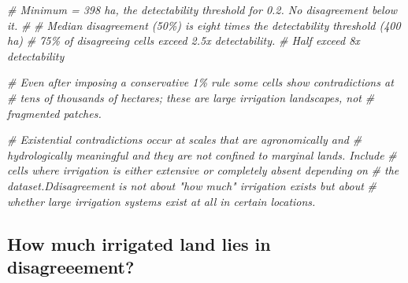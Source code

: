 \documentclass[
  11pt,
]{article}
\newenvironment{Shaded}{\begin{snugshade}}{\end{snugshade}}
\newcommand{\CommentTok}[1]{\textcolor[rgb]{0.56,0.35,0.01}{\textit{#1}}}
\newcommand{\FunctionTok}[1]{\textcolor[rgb]{0.13,0.29,0.53}{\textbf{#1}}}
\newcommand{\NormalTok}[1]{#1}
\newcommand{\OtherTok}[1]{\textcolor[rgb]{0.56,0.35,0.01}{#1}}
\newcommand{\SpecialCharTok}[1]{\textcolor[rgb]{0.81,0.36,0.00}{\textbf{#1}}}
\begin{document}
\begin{Shaded}
\begin{Highlighting}[]
\CommentTok{\# Minimum = 398 ha, the detectability threshold for 0.2. No disagreement below it.}
\CommentTok{\#}
\CommentTok{\# Median disagreement (50\%) is eight times the detectability threshold (400 ha)}
\CommentTok{\# 75\% of disagreeing cells exceed 2.5x detectability.}
\CommentTok{\# Half exceed 8x detectability}

\CommentTok{\# Even after imposing a conservative 1\% rule some cells show contradictions at}
\CommentTok{\# tens of thousands of hectares; these are large irrigation landscapes, not}
\CommentTok{\# fragmented patches.}

\CommentTok{\# Existential contradictions occur at scales that are agronomically and}
\CommentTok{\# hydrologically meaningful and they are not confined to marginal lands. Include}
\CommentTok{\# cells where irrigation is either extensive or completely absent depending on}
\CommentTok{\# the dataset.Ddisagreement is not about "how much" irrigation exists but about}
\CommentTok{\# whether large irrigation systems exist at all in certain locations.}
\end{Highlighting}
\end{Shaded}

\subsection{How much irrigated land lies in
disagreeement?}\label{how-much-irrigated-land-lies-in-disagreeement}

\begin{Shaded}
\end{Shaded}
\end{document}
